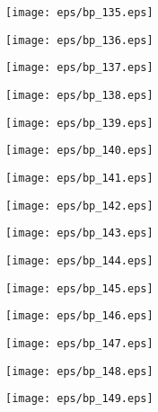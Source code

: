 \documentclass{book}
\begin{document}
	\clearpage\begin{figure}[p]
    \centering
	\texttt{[image: eps/bp\_135.eps]}
	\end{figure}
	\clearpage\begin{figure}[p]
    \centering
	\texttt{[image: eps/bp\_136.eps]}
	\end{figure}
	\clearpage\begin{figure}[p]
    \centering
	\texttt{[image: eps/bp\_137.eps]}
	\end{figure}
	\clearpage\begin{figure}[p]
    \centering
	\texttt{[image: eps/bp\_138.eps]}
	\end{figure}
	\clearpage\begin{figure}[p]
    \centering
	\texttt{[image: eps/bp\_139.eps]}
	\end{figure}
	\clearpage\begin{figure}[p]
    \centering
	\texttt{[image: eps/bp\_140.eps]}
	\end{figure}
	\clearpage\begin{figure}[p]
    \centering
	\texttt{[image: eps/bp\_141.eps]}
	\end{figure}
	\clearpage\begin{figure}[p]
    \centering
	\texttt{[image: eps/bp\_142.eps]}
	\end{figure}
	\clearpage\begin{figure}[p]
    \centering
	\texttt{[image: eps/bp\_143.eps]}
	\end{figure}
	\clearpage\begin{figure}[p]
    \centering
	\texttt{[image: eps/bp\_144.eps]}
	\end{figure}
	\clearpage\begin{figure}[p]
    \centering
	\texttt{[image: eps/bp\_145.eps]}
	\end{figure}
	\clearpage\begin{figure}[p]
    \centering
	\texttt{[image: eps/bp\_146.eps]}
	\end{figure}
	\clearpage\begin{figure}[p]
    \centering
	\texttt{[image: eps/bp\_147.eps]}
	\end{figure}
	\clearpage\begin{figure}[p]
    \centering
	\texttt{[image: eps/bp\_148.eps]}
	\end{figure}
	\clearpage\begin{figure}[p]
    \centering
	\texttt{[image: eps/bp\_149.eps]}
	\end{figure}
\end{document}
